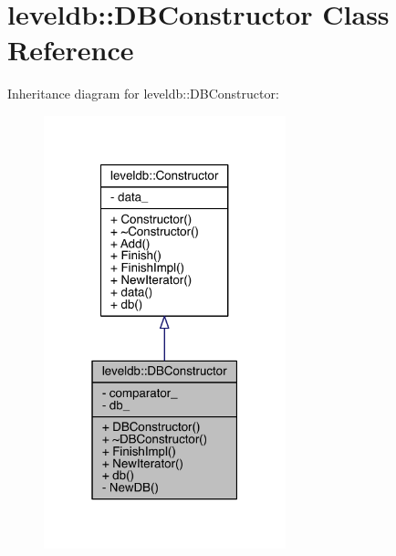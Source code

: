 \hypertarget{classleveldb_1_1_d_b_constructor}{}\section{leveldb\+:\+:D\+B\+Constructor Class Reference}
\label{classleveldb_1_1_d_b_constructor}


Inheritance diagram for leveldb\+:\+:D\+B\+Constructor\+:\nopagebreak
\begin{figure}[H]
\begin{center}
\leavevmode
\includegraphics[width=199pt]{classleveldb_1_1_d_b_constructor__inherit__graph}
\end{center}
\end{figure}


